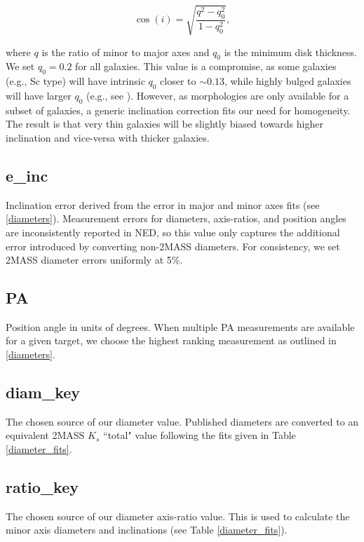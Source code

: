 \documentclass[twocolumn,tighten]{aastex62}
\begin{document}
\begin{equation}
	\cos(i) = \sqrt{\frac{q^2 - q_0^2}{1 - q_0^2}},
	\label{incEq}
\end{equation}

\noindent where $q$ is the ratio of minor to major axes and $q_0$ is the minimum disk thickness. We set $q_0 = 0.2$ for all galaxies. This value is a compromise, as some galaxies (e.g., Sc type) will have intrinsic $q_0$ closer to $\sim 0.13$, while highly bulged galaxies will have larger $q_0$ (e.g., see \citealt{heidmann1972c}). However, as morphologies are only available for a subset of galaxies, a generic inclination correction fits our need for homogeneity. The result is that very thin galaxies will be slightly biased towards higher inclination and vice-versa with thicker galaxies.

\subsection{e\_inc} \label{e_inc}
Inclination error derived from the error in major and minor axes fits (see \ref{diameters}). Measurement errors for diameters, axis-ratios, and position angles are inconsistently reported in NED, so this value only captures the additional error introduced by converting non-2MASS diameters. For consistency, we set 2MASS diameter errors uniformly at 5\%.

\subsection{PA} \label{PA}
Position angle in units of degrees. When multiple PA measurements are available for a given target, we choose the highest ranking measurement as outlined in \ref{diameters}.

\subsection{diam\_key} \label{diameter_key}
The chosen source of our diameter value. Published diameters are converted to an equivalent 2MASS $K_s$ ``total" value following the fits given in Table \ref{diameter_fits}.

\subsection{ratio\_key} \label{ratio_key}
The chosen source of our diameter axis-ratio value. This is used to calculate the minor axis diameters and inclinations (see Table \ref{diameter_fits}).
\end{document}
